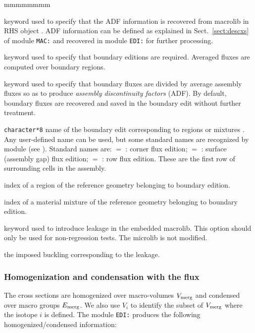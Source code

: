 \begin{ListeDeDescription}{mmmmmmmm}
\item[\moc{ADFM}] keyword used to specify that the ADF information is recovered from macrolib in RHS object . ADF information can
be defined as explained in Sect.~\ref{sect:descxs} of module {\tt MAC:} and recovered in module {\tt EDI:} for further processing.

\item[\moc{ADF}] keyword used to specify that boundary editions are required. Averaged fluxes are
computed over boundary regions.

\item[\moc{*}] keyword used to specify that boundary fluxes are divided by average assembly fluxes so as to produce {\sl assembly discontinuity factors}
(ADF). By default, boundary fluxes are recovered and saved in the boundary edit without further treatment.

\item[\dusa{TYPE}] {\tt character*8} name of the boundary edit corresponding to
regions  or mixtures . Any user-defined name can be used, but some
standard names are recognized by module  (see ). Standard names are: $=$ :
corner flux edition; $=$ : surface (assembly gap) flux edition; $=$ :
row flux edition. These are the first row of surrounding cells in the assembly.

\item[\dusa{ireg}] index of a region of the reference geometry belonging to boundary edition.

\item[\dusa{imix}] index of a material mixture of the reference geometry belonging to boundary edition.

\item[\moc{LEAK}] keyword used to introduce leakage in the embedded {\sc macrolib}. This option should only be used for non-regression tests. The {\sc microlib} is not modified.

\item[\dusa{b2}] the imposed buckling corresponding to the leakage.

\end{ListeDeDescription}

\subsubsection{Homogenization and condensation with the flux}

The cross sections are homogenized over macro-volumes $V_{\rm merg}$ and condensed over
macro groups $E_{\rm merg}$. We also use $V_i$ to identify the subset of $V_{\rm merg}$ where
the isotope $i$ is defined. The module {\tt EDI:} produces the following homogenized/condensed information:

